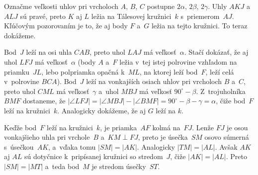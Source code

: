 {%
Označme veľkosti uhlov pri vrcholoch $A$, $B$, $C$ postupne $2\alpha$, $2\beta$, $2\gamma$.
Uhly $AKJ$ a~$ALJ$ sú pravé, preto $K$ aj $L$ ležia na Tálesovej kružnici~$k$ s~priemerom~$AJ$.
Kľúčovým pozorovaním je to, že aj body $F$ a~$G$ ležia na tejto kružnici. To teraz dokážeme.

Bod~$J$ leží na osi uhla $CAB$, preto uhol $LAJ$ má veľkosť~$\alpha$. Stačí dokázať, že aj uhol $LFJ$ má veľkosť~$\alpha$ (body $A$ a~$F$ ležia v~tej istej polrovine vzhľadom na priamku~$JL$, lebo polpriamka opačná k~$ML$, na ktorej leží bod~$F$, leží celá v~polrovine $BCA$). Bod~$J$ leží na vonkajších osiach uhlov pri vrcholoch $B$ a~$C$, preto uhol $CML$ má veľkosť~$\gamma$ a~uhol $MBJ$ má veľkosť $90^\circ-\beta$. Z~trojuholníka $BMF$ dostaneme, že $|\angle LFJ|=|\angle MBJ|-|\angle BMF|=90^\circ-\beta-\gamma =\alpha$, čiže bod~$F$ leží na kružnici~$k$. Analogicky dokážeme, že aj $G$ leží na $k$.
%

Keďže bod~$F$ leží na kružnici~$k$, je priamka~$AF$ kolmá na~$FJ$.
Lenže $FJ$ je osou vonkajšieho uhla pri vrchole~$B$ a~$KM\perp FJ$, preto je úsečka~$SM$ osovo súmerná s~úsečkou~$AK$, a~vďaka tomu $|SM|=|AK|$. Analogicky $|TM|=|AL|$. Avšak $AK$ aj $AL$ sú dotyčnice k~pripísanej kružnici so stredom~$J$, čiže $|AK|=|AL|$.
Preto $|SM| = |MT|$ a~teda bod~$M$ je stredom úsečky~$ST$.
}

